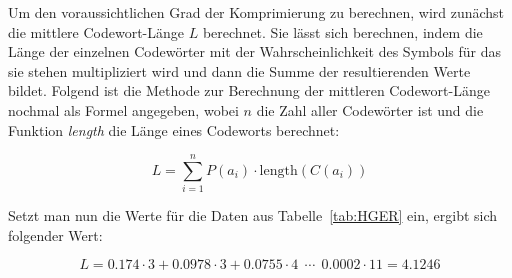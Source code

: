 \documentclass[twoside,11pt,a4paper]{article}
\theoremstyle{break}
\begin{document}
Um den voraussichtlichen Grad der Komprimierung zu berechnen, wird
zunächst die mittlere Codewort-Länge $L$ berechnet. Sie lässt sich
berechnen, indem die Länge der einzelnen Codewörter mit der
Wahrscheinlichkeit des Symbols für das sie stehen multipliziert wird
und dann die Summe der resultierenden Werte bildet. Folgend ist die
Methode zur Berechnung der mittleren Codewort-Länge nochmal als Formel
angegeben, wobei $n$ die Zahl aller Codewörter ist und die
Funktion \emph{length} die Länge eines Codeworts berechnet:

\begin{equation}
L = \sum_{i=1}^{n} P(a_i) \cdot \mathrm{length}(C(a_i))
\end{equation}

Setzt man nun die Werte für die Daten aus Tabelle~\ref{tab:HGER} ein,
ergibt sich folgender Wert:

\begin{equation}
L = 0.174 \cdot 3 + 0.0978 \cdot 3 + 0.0755 \cdot 4\ \ \cdots\ \ 0.0002 \cdot 11 = 4.1246
\end{equation}
\end{document}
